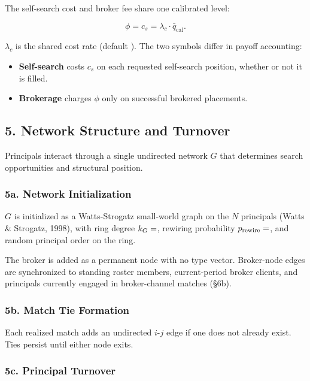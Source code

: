 \documentclass[11pt]{article}
\providecommand{\tightlist}{%
  \setlength{\itemsep}{0pt}\setlength{\parskip}{0pt}}
\begin{document}
The self-search cost and broker fee share one calibrated level:

\[
\phi = c_s = \lambda_c \cdot \bar{q}_{\text{cal}}.
\]

\(\lambda_c\) is the shared cost rate (default ). The two symbols differ in payoff accounting:

\begin{itemize}
\tightlist
\item \textbf{Self-search} costs \(c_s\) on each requested self-search position, whether or not it is filled.
\item \textbf{Brokerage} charges \(\phi\) only on successful brokered placements.
\end{itemize}

\subsection{5. Network Structure and Turnover}\label{network-structure-and-turnover}

Principals interact through a single undirected network \(G\) that determines search opportunities and structural position.

\subsubsection{5a. Network Initialization}\label{a.-network-initialization}

\(G\) is initialized as a Watts-Strogatz small-world graph on the \(N\) principals (Watts \& Strogatz, 1998), with ring degree \(k_G = \pv{settingk}\), rewiring probability \(p_{\text{rewire}} = \pv{settingp_rewire}\), and random principal order on the ring.

The broker is added as a permanent node with no type vector. Broker-node edges are synchronized to standing roster members, current-period broker clients, and principals currently engaged in broker-channel matches (§6b).

\subsubsection{5b. Match Tie Formation}\label{b.-match-tie-formation}

Each realized match adds an undirected \(i\)-\(j\) edge if one does not already exist. Ties persist until either node exits.

\subsubsection{5c. Principal Turnover}\label{c.-agent-turnover}
\end{document}

